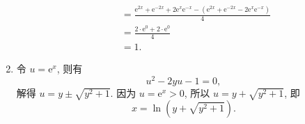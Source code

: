 \documentclass[12pt]{article}
\begin{document}
\begin{enumerate}
\begin{enumerate}[(1)]
\begin{align*}
                                        &= \frac{\mathrm{e}^{2x} + \mathrm{e}^{-2x} + 2\mathrm{e}^x\mathrm{e}^{-x} - (\mathrm{e}^{2x} + \mathrm{e}^{-2x} - 2\mathrm{e}^x\mathrm{e}^{-x})}{4} \\
                                        &= \frac{2 \cdot \mathrm{e}^0 + 2 \cdot \mathrm{e}^0}{4} \\
                                        &= 1.
                \end{align*}
        \end{enumerate}
    \item %
        令 $u = \mathrm{e}^x$, 则有
        \[
            u^2 - 2yu - 1 = 0,    
        \]
        解得 $u = y \pm \sqrt{y^2 + 1}$. 因为 $u = \mathrm{e}^x > 0$, 所以 $u = y + \sqrt{y^2 + 1}$, 即
        \[
            x = \ln(y + \sqrt{y^2 + 1}).    
        \]
\end{enumerate}
\end{document}
